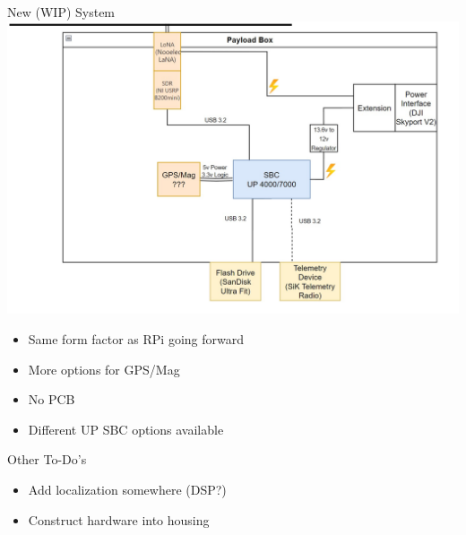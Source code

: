 \begin{frame}{New (WIP) System}
    \centering
    \includegraphics[height=.6\textheight,width=.6\textwidth,keepaspectratio]{images/rtt/NewSystem.jpg}
    \begin{itemize}
        \item Same form factor as RPi going forward
        \item More options for GPS/Mag
        \item No PCB
        \item Different UP SBC options available
    \end{itemize}
\end{frame}
\begin{frame}{Other To-Do's}
    \begin{itemize}
        \item Add localization somewhere (DSP?)
        \item Construct hardware into housing
    \end{itemize}
\end{frame}
